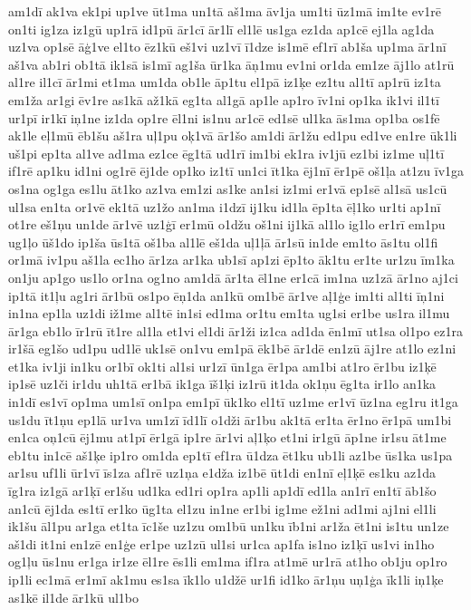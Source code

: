 {am1dī
ak1va
ek1pi
up1ve
ūt1ma
un1tā
aš1ma
āv1ja
um1ti
ūz1mā
im1te
ev1rē
on1ti
ig1za
iz1gū
up1rā
id1pū
ār1cī
ār1lī
el1lē
us1ga
ez1da
ap1cē
ej1la
ag1da
uz1va
op1sē
āģ1ve
el1to
ēz1kū
eš1vi
uz1vī
ī1dze
is1mē
ef1rī
ab1ša
up1ma
ār1nī
aš1va
ab1ri
ob1tā
ik1sā
is1mī
ag1ša
ūr1ka
āņ1mu
ev1ni
or1da
em1ze
āj1lo
at1rū
al1re
il1cī
ār1mi
et1ma
um1da
ob1le
āp1tu
el1pā
iz1ķe
ez1tu
al1tī
ap1rū
iz1ta
em1ža
ar1gi
ēv1re
as1kā
až1kā
eg1ta
al1gā
ap1le
ap1ro
īv1ni
op1ka
ik1vi
il1tī
ur1pī
ir1kī
iņ1ne
iz1da
op1re
ēl1ni
is1nu
ar1cē
ed1sē
ul1ka
ās1ma
op1ba
os1fē
ak1le
eļ1mū
ēb1šu
aš1ra
uļ1pu
oķ1vā
ār1šo
am1di
ār1žu
ed1pu
ed1ve
en1re
ūk1li
uš1pi
ep1ta
al1ve
ad1ma
ez1ce
ēg1tā
ud1rī
im1bi
ek1ra
iv1jū
ez1bi
iz1me
uļ1tī
if1rē
ap1ku
id1ni
og1rē
ēj1de
op1ko
iz1tī
un1ci
īt1ka
ēj1nī
ēr1pē
oš1ļa
at1zu
īv1ga
os1na
og1ga
es1lu
āt1ko
az1va
em1zi
as1ke
an1si
iz1mi
er1vā
ep1sē
al1sā
us1cū
ul1sa
en1ta
or1vē
ek1tā
uz1žo
an1ma
i1dzī
ij1ku
id1la
ēp1ta
ēļ1ko
ur1ti
ap1nī
ot1re
eš1ņu
un1de
ār1vē
uz1ģī
er1mū
o1džu
oš1ni
ij1kā
al1lo
ig1lo
er1rī
em1pu
ug1ļo
ūš1do
ip1ša
ūs1tā
oš1ba
al1lē
eš1da
uļ1ļā
ār1sū
in1de
em1to
ās1tu
ol1fi
or1mā
iv1pu
aš1la
ec1ho
ār1za
ar1ka
ub1sī
ap1zi
ēp1to
āk1tu
er1te
ur1zu
īm1ka
on1ju
ap1go
us1lo
or1na
og1no
am1dā
ār1ta
ēl1ne
er1cā
im1na
uz1zā
ār1no
aj1ci
ip1tā
it1ļu
ag1ri
ār1bū
os1po
ēņ1da
an1kū
om1bē
ār1ve
aļ1ģe
im1ti
al1ti
īņ1ni
in1na
ep1la
uz1di
iž1me
al1tē
in1si
ed1ma
or1tu
em1ta
ug1si
er1be
us1ra
il1mu
ār1ga
eb1lo
īr1rū
īt1re
al1la
et1vi
el1di
ār1ži
iz1ca
ad1da
ēn1mī
ut1sa
ol1po
ez1ra
ir1šā
eg1šo
ud1pu
ud1lē
uk1sē
on1vu
em1pā
ēk1bē
ār1dē
en1zū
āj1re
at1lo
ez1ni
et1ka
iv1ji
in1ku
or1bī
ok1ti
al1si
ur1zī
ūn1ga
ēr1pa
am1bi
at1ro
ēr1bu
iz1ķē
ip1sē
uz1či
ir1du
uh1tā
er1bā
ik1ga
īš1ķi
iz1rū
it1da
ok1ņu
ēg1ta
ir1lo
an1ka
in1dī
es1vī
op1ma
um1sī
on1pa
em1pī
ūk1ko
el1tī
uz1me
er1vī
ūz1na
eg1ru
it1ga
us1du
īt1ņu
ep1lā
ur1va
um1zī
īd1lī
o1dži
ār1bu
ak1tā
er1ta
ēr1no
ēr1pā
um1bi
en1ca
oņ1cū
ēj1mu
at1pī
ēr1gā
ip1re
ār1vi
aļ1ķo
et1ni
ir1gū
āp1ne
ir1su
āt1me
eb1tu
in1cē
aš1ķe
ip1ro
om1da
ep1tī
ef1ra
ū1dza
ēt1ku
ub1li
az1be
ūs1ka
us1pa
ar1su
uf1li
ūr1vī
īs1za
af1rē
uz1ņa
e1dža
iz1bē
ūt1di
en1nī
eļ1ķē
es1ku
az1da
īg1ra
iz1gā
ar1ķī
er1šu
ud1ka
ed1ri
op1ra
ap1li
ap1dī
ed1la
an1rī
en1tī
āb1šo
an1cū
ēj1da
es1tī
er1ko
ūg1ta
el1zu
in1ne
er1bi
ig1me
ež1ni
ad1mi
aj1ni
el1li
ik1šu
āl1pu
ar1ga
et1ta
īc1še
uz1zu
om1bū
un1ku
īb1ni
ar1ža
ēt1ni
is1tu
un1ze
aš1di
it1ni
en1zē
en1ģe
er1pe
uz1zū
ul1si
ur1ca
ap1fa
is1no
iz1ķī
us1vi
in1ho
og1ļu
ūs1nu
er1ga
ir1ze
ēl1re
ēs1li
em1ma
if1ra
at1mē
ur1rā
at1ho
ob1ju
op1ro
ip1li
ec1mā
er1mī
ak1mu
es1sa
īk1lo
u1džē
ur1fi
id1ko
ār1ņu
uņ1ģa
īk1li
iņ1ķe
as1kē
il1de
ār1kū
ul1bo
}
